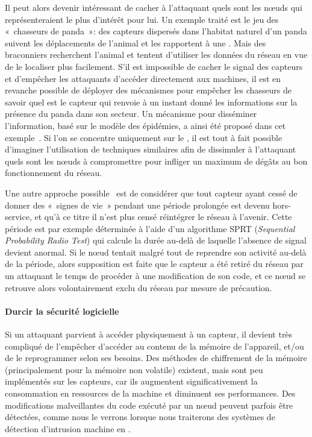 Il peut alors devenir intéressant de cacher à l'attaquant quels sont les nœuds qui représenteraient le plus d'intérêt pour lui.
Un exemple traité est le jeu des « chasseurs de panda »: des capteurs dispersés dans l'habitat naturel d'un panda suivent les déplacements de l'animal et les rapportent à une \sdb.
Mais des braconniers recherchent l'animal et tentent d'utiliser les données du réseau en vue de le localiser plus facilement.
S'il est impossible de cacher le signal des capteurs et d'empêcher les attaquants d'accéder directement aux machines, il est en revanche possible de déployer des mécanismes pour empêcher les chasseurs de savoir quel est le capteur qui renvoie à un instant donné les informations sur la présence du panda dans son secteur.
Un mécanisme pour disséminer l'information, basé sur le modèle des épidémies, a ainsi été proposé dans cet exemple~\cite{KDA14}.
Si l'on se concentre uniquement sur le \dds, il est tout à fait possible d'imaginer l'utilisation de techniques similaires afin de dissimuler à l'attaquant quels sont les nœuds à compromettre pour infliger un maximum de dégâts au bon fonctionnement du réseau.

Une autre approche possible~\cite{Ho10} est de considérer que tout capteur ayant cessé de donner des « signes de vie » pendant une période prolongée est devenu hors-service, et qu'à ce titre il n'est plus censé réintégrer le réseau à l'avenir.
Cette période est par exemple déterminée à l'aide d'un algorithme SPRT (\textit{Sequential Probability Radio Test}) qui calcule la durée au-delà de laquelle l'absence de signal devient anormal.
Si le nœud tentait malgré tout de reprendre son activité au-delà de la période, alors supposition est faite que le capteur a été retiré du réseau par un attaquant le temps de procéder à une modification de son code, et ce nœud se retrouve alors volontairement exclu du réseau par mesure de précaution.

\paragraph{Durcir la sécurité logicielle}
Si un attaquant parvient à accéder physiquement à un capteur, il devient très compliqué de l'empêcher d'accéder au contenu de la mémoire de l'appareil, et/ou de le reprogrammer selon ses besoins.
Des méthodes de chiffrement de la mémoire (principalement pour la mémoire non volatile) existent, mais sont peu implémentés sur les capteurs, car ils augmentent significativement la consommation en ressources de la machine et diminuent ses performances.
Des modifications malveillantes du code exécuté par un nœud peuvent parfois être détectées, comme nous le verrons lorsque nous traiterons des systèmes de détection d'intrusion machine en .

